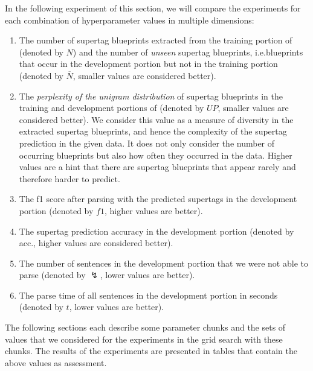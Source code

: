 \documentclass[../../document.tex]{subfiles}
\begin{document}
    In the following experiment of this section, we will compare the experiments for each combination of hyperparameter values in multiple dimensions:
    \begin{enumerate}
        \item The number of supertag blueprints extracted from the training portion of \negra{} (denoted by \(N\)) and the number of \emph{unseen} supertag blueprints, i.e.\@ blueprints that occur in the development portion but not in the training portion (denoted by \(\overline{N}\), smaller values are considered better).
        \item The \emph{perplexity of the unigram distribution} of supertag blueprints in the training and development portions of \negra{} (denoted by \(\mathit{UP}\), smaller values are considered better). We consider this value as a measure of diversity in the extracted supertag blueprints, and hence the complexity of the supertag prediction in the given data. It does not only consider the number of occurring blueprints but also how often they occurred in the data. Higher values are a hint that there are supertag blueprints that appear rarely and therefore harder to predict.
        \item The f1 score after parsing with the predicted supertags in the development portion (denoted by \(f1\), higher values are better).
        \item The supertag prediction accuracy in the development portion (denoted by acc., higher values are considered better).
        \item The number of sentences in the development portion that we were not able to parse (denoted by $\lightning$, lower values are better).
        \item The parse time of all sentences in the development portion in seconds (denoted by \(t\), lower values are better).
    \end{enumerate}
    
    The following sections each describe some parameter chunks and the sets of values that we considered for the experiments in the grid search with these chunks.
    The results of the experiments are presented in tables that contain the above values as assessment.
    
\end{document}
